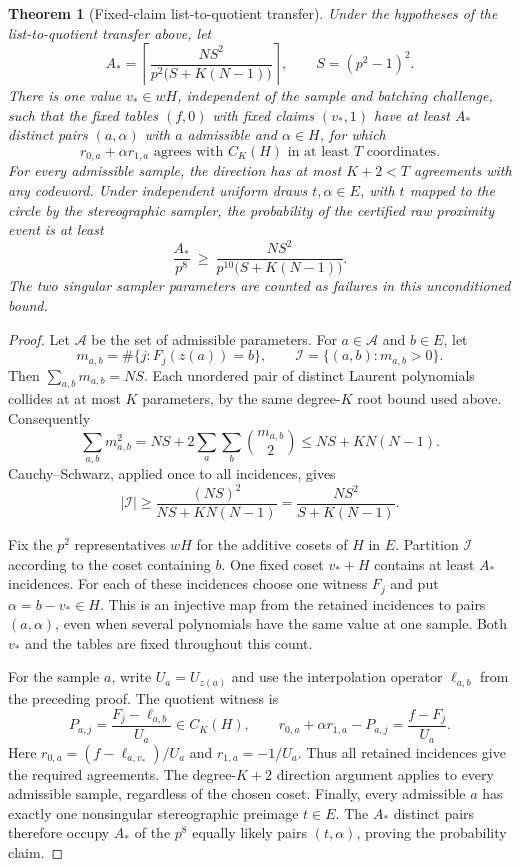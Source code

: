 \documentclass[11pt,letterpaper]{article}
\newtheorem{theorem}{Theorem}[section]
\theoremstyle{definition}
\theoremstyle{remark}
\begin{document}
\begin{theorem}[Fixed-claim list-to-quotient transfer]
\label{thm:fixed-claim-transfer}
Under the hypotheses of the list-to-quotient transfer above, let
\[
 A_* = \left\lceil
 \frac{N S^2}{p^2\bigl(S+K(N-1)\bigr)}
 \right\rceil,\qquad S=(p^2-1)^2.
\]
There is one value $v_*\in wH$, independent of the sample and batching
challenge, such that the fixed tables $(f,0)$ with fixed claims
$(v_*,1)$ have at least $A_*$ distinct pairs $(a,\alpha)$ with
$a$ admissible and $\alpha\in H$, for which
\[
 r_{0,a}+\alpha r_{1,a}
 \text{ agrees with }C_K(H)\text{ in at least }T\text{ coordinates}.
\]
For every admissible sample, the direction has at most $K+2<T$
agreements with any codeword. Under independent uniform draws
$t,\alpha\in E$, with $t$ mapped to the circle by the stereographic
sampler, the probability of the certified raw proximity event is at least
\begin{equation}\label{eq:fixed-claim-probability}
 \frac{A_*}{p^8}
 \ \ge\ {}
 \frac{N S^2}{p^{10}\bigl(S+K(N-1)\bigr)}.
\end{equation}
The two singular sampler parameters are counted as failures in this
unconditioned bound.
\end{theorem}
\begin{proof}
Let $\mathcal A$ be the set of admissible parameters. For $a\in\mathcal A$
and $b\in E$, let
\[
 m_{a,b}=\#\{j:F_j(z(a))=b\},\qquad
 \mathcal I=\{(a,b):m_{a,b}>0\}.
\]
Then $\sum_{a,b}m_{a,b}=NS$. Each unordered pair of distinct Laurent
polynomials collides at at most $K$ parameters, by the same degree-$K$
root bound used above. Consequently
\[
 \sum_{a,b}m_{a,b}^2
 =NS+2\sum_a\sum_b\binom{m_{a,b}}2
 \le NS+K N(N-1).
\]
Cauchy--Schwarz, applied once to all incidences, gives
\begin{equation}\label{eq:global-evaluation-incidences}
 |\mathcal I|\ge
 \frac{(NS)^2}{NS+KN(N-1)}
 =\frac{NS^2}{S+K(N-1)}.
\end{equation}

Fix the $p^2$ representatives $wH$ for the additive cosets of $H$ in
$E$. Partition $\mathcal I$ according to the coset containing $b$.
One fixed coset $v_*+H$ contains at least $A_*$ incidences. For each
of these incidences choose one witness $F_j$ and put
$\alpha=b-v_*\in H$. This is an injective map from the retained
incidences to pairs $(a,\alpha)$, even when several polynomials have
the same value at one sample. Both $v_*$ and the tables are fixed
throughout this count.

For the sample $a$, write $U_a=U_{z(a)}$ and use the interpolation
operator $\ell_{a,b}$ from the preceding proof. The quotient witness is
\[
 P_{a,j}=\frac{F_j-\ell_{a,b}}{U_a}\in C_K(H),
 \qquad
 r_{0,a}+\alpha r_{1,a}-P_{a,j}
 =\frac{f-F_j}{U_a}.
\]
Here $r_{0,a}=(f-\ell_{a,v_*})/U_a$ and $r_{1,a}=-1/U_a$.
Thus all retained incidences give the required agreements. The
degree-$K+2$ direction argument applies to every admissible sample,
regardless of the chosen coset. Finally, every admissible $a$ has
exactly one nonsingular stereographic preimage $t\in E$. The
$A_*$ distinct pairs therefore occupy $A_*$ of the $p^8$ equally
likely pairs $(t,\alpha)$, proving the probability claim.
\end{proof}
\end{document}

